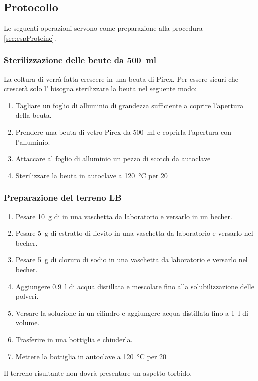 \subsection{Protocollo}
Le seguenti operazioni servono come preparazione alla procedura \ref{sec:espProteine}.
\subsubsection{Sterilizzazione delle beute da {\boldmath \qty{500}{\ml}}}
La coltura di  verrà fatta crescere in una beuta di Pirex. Per essere sicuri che crescerà solo l' bisogna sterilizzare la beuta nel seguente modo:
\begin{enumerate}
	\item Tagliare un foglio di alluminio di grandezza sufficiente a coprire l’apertura della beuta.
	\item Prendere una beuta di vetro Pirex da \qty{500}{\ml} e coprirla l'apertura con l’alluminio.
	\item Attaccare al foglio di alluminio un pezzo di scotch da autoclave
	\item Sterilizzare la beuta in autoclave a \qty{120}{\celsius} per \qty{20}{\min}
\end{enumerate}

\endgroup

\subsubsection{Preparazione del terreno LB}
\begin{enumerate}
	\item Pesare \qty{10}{\g} di  in una vaschetta da laboratorio e versarlo in un becher.
	\item Pesare \qty{5}{\g} di estratto di lievito in una vaschetta da laboratorio e versarlo nel becher. 
	\item Pesare \qty{5}{\g} di cloruro di sodio in una vaschetta da laboratorio e versarlo nel becher.
	\item Aggiungere \qty{0.9}{\l} di acqua distillata e mescolare fino alla solubilizzazione delle polveri.
	\item Versare la soluzione in un cilindro e aggiungere acqua distillata fino a \qty{1}{\litre} di volume.
	\item Trasferire in una bottiglia e chiuderla.
	\item Mettere la bottiglia in autoclave a \qty{120}{\celsius} per \qty{20}{\min}
\end{enumerate}	
Il terreno risultante non dovrà presentare un aspetto torbido.


